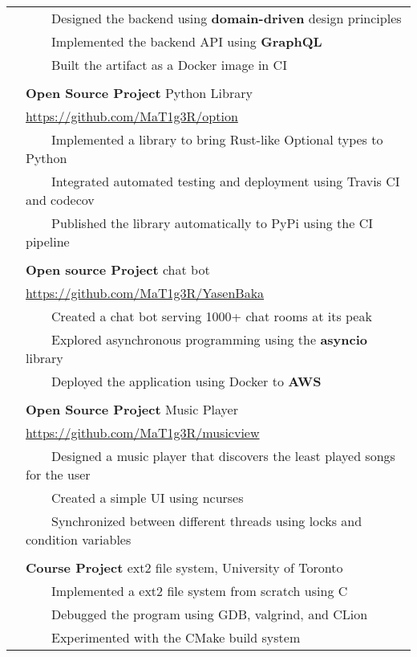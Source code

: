 \documentclass[letterpaper,12pt,oneside]{article}
\newcommand{\tabitem}{~~\llap{\textbullet}~~}
\newcommand{\smallurl}[1]{\small{\url{#1}}}
\begin{document}
\begin{longtable}{@{} l p{14cm}}
& \tabitem Designed the backend using \textbf{domain-driven} design principles \\
& \tabitem Implemented the backend API using \textbf{GraphQL} \\
& \tabitem Built the artifact as a Docker image in CI \\
& \\
& \textbf{Open Source Project} Python Library \\
& \smallurl{https://github.com/MaT1g3R/option} \\
& \tabitem Implemented a library to bring Rust-like Optional types to Python \\
& \tabitem Integrated automated testing and deployment using Travis CI and codecov \\
& \tabitem Published the library automatically to PyPi using the CI pipeline \\
& \\
& \textbf{Open source Project} chat bot \\
& \smallurl{https://github.com/MaT1g3R/YasenBaka} \\
& \tabitem Created a chat bot serving 1000+ chat rooms at its peak \\
& \tabitem Explored asynchronous programming using the \textbf{asyncio} library \\
& \tabitem Deployed the application using Docker to \textbf{AWS} \\
& \\
& \textbf{Open Source Project} Music Player \\
& \smallurl{https://github.com/MaT1g3R/musicview} \\
& \tabitem Designed a music player that discovers the least played songs for the user \\
& \tabitem Created a simple UI using ncurses \\
& \tabitem Synchronized between different threads using locks and condition variables \\
& \\
& \textbf{Course Project} ext2 file system, University of Toronto \\
& \tabitem Implemented a ext2 file system from scratch using C \\
& \tabitem Debugged the program using GDB, valgrind, and CLion \\
& \tabitem Experimented with the CMake build system \\
\end{longtable}
\end{document}
